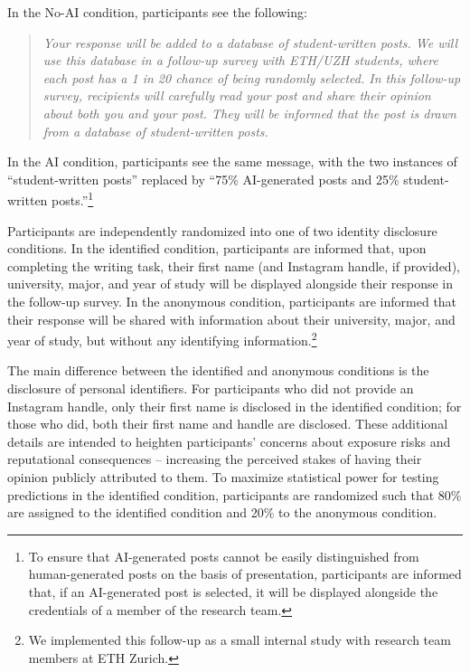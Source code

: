 \documentclass[12pt,notitlepage]{article}
\theoremstyle{plain}
\theoremstyle{plain}
\theoremstyle{definition}
\theoremstyle{definition}
\theoremstyle{assumption}
\theoremstyle{plain}
\theoremstyle{plain}
\theoremstyle{plain}
\theoremstyle{plain}
\theoremstyle{definition}%
\theoremstyle{plain}
\theoremstyle{plain}
\theoremstyle{plain}
\theoremstyle{plain}
\begin{document}
In the No-AI condition, participants see the following:
\begin{quote}
\textit{Your response will be added to a database of student-written posts. We will use this database in a follow-up survey with ETH/UZH students, where each post has a 1 in 20 chance of being randomly selected. In this follow-up survey, recipients will carefully read your post and share their opinion about both you and your post. They will be informed that the post is drawn from a database of 
student-written posts.}
\end{quote}
In the AI condition, participants see the same message, with the two instances of ``student-written posts'' replaced by ``75\% AI-generated posts and 25\% student-written posts.''\footnote{To ensure that AI-generated posts cannot be easily distinguished from human-generated posts on the basis of presentation, participants are informed that, if an AI-generated post is selected, it will be displayed alongside the credentials of a member of the research team.}


Participants are independently randomized into one of two identity disclosure conditions. In the identified condition, participants are informed that, upon completing the writing task, their first name (and Instagram handle, if provided), university, major, and year of study will be displayed alongside their response in the follow-up survey. In the anonymous condition, participants are informed that their response will be shared with information about their university, major, and year of study, but without any identifying information.\footnote{We implemented this follow-up as a small internal study with research team members at ETH Zurich.}  


The main difference between the identified and anonymous conditions is the disclosure of personal identifiers. For participants who did not provide an Instagram handle, only their first name is disclosed in the identified condition; for those who did, both their first name and handle are disclosed. These additional details are intended to heighten participants' concerns about exposure risks and reputational consequences -- increasing the perceived stakes of having their opinion publicly attributed to them. To maximize statistical power for testing predictions in the identified condition, participants are randomized such that 80\% are assigned to the identified condition and 20\% to the anonymous condition.
\end{document}
